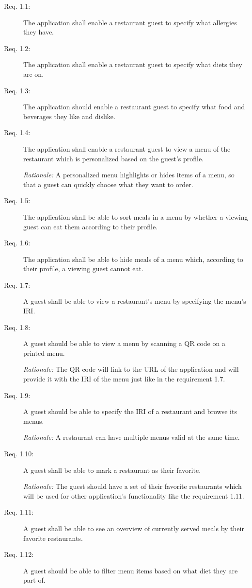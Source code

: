 \begin{description}
    \item [Req. 1.1:] The application shall enable a restaurant guest to specify what allergies they have.
    \item [Req. 1.2:] The application shall enable a restaurant guest to specify what diets they are on.
    \item [Req. 1.3:] The application should enable a restaurant guest to specify what food and beverages they like and dislike.
    \item [Req. 1.4:] The application shall enable a restaurant guest to view a menu of the restaurant which is personalized based on the guest's profile.

    \emph{Rationale:} A personalized menu highlights or hides items of a menu, so that a guest can quickly choose what they want to order. 
    \item [Req. 1.5:] The application shall be able to sort meals in a menu by whether a viewing guest can eat them according to their profile.
    \item [Req. 1.6:] The application shall be able to hide meals of a menu which, according to their profile, a viewing guest cannot eat.
    \item [Req. 1.7:] A guest shall be able to view a restaurant's menu by specifying the menu's IRI.
    \item [Req. 1.8:] A guest should be able to view a menu by scanning a QR code on a printed menu.

    \emph{Rationale:} The QR code will link to the URL of the application and will provide it with the IRI of the menu just like in the requirement 1.7.
    \item [Req. 1.9:] A guest should be able to specify the IRI of a restaurant and browse its menus.

    \emph{Rationale:} A restaurant can have multiple menus valid at the same time. 
    \item [Req. 1.10:] A guest shall be able to mark a restaurant as their favorite.
    
    \emph{Rationale:} The guest should have a set of their favorite restaurants which will be used for other application's functionality like the requirement 1.11.
    \item [Req. 1.11:] A guest shall be able to see an overview of currently served meals by their favorite restaurants.
    \item [Req. 1.12:] A guest should be able to filter menu items based on what diet they are part of.


\end{description}
